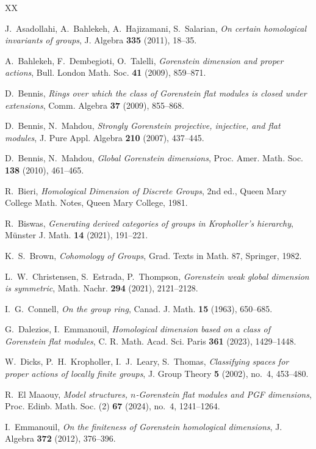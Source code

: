 \documentclass[12pt]{amsart}
\theoremstyle{remark}
\theoremstyle{definition}
\theoremstyle{plain}
\begin{document}
\begin{thebibliography}{XX}


 J.~Asadollahi, A.~Bahlekeh, A.~Hajizamani, S.~Salarian, \emph{On certain homological invariants of groups}, J. Algebra \textbf{335} (2011), 18--35.

 A.~Bahlekeh, F.~Dembegioti, O.~Talelli, \emph{Gorenstein dimension and proper actions}, Bull. London Math. Soc. \textbf{41} (2009), 859--871.

 D.~Bennis, \emph{Rings over which the class of Gorenstein flat modules is closed under extensions}, Comm. Algebra \textbf{37} (2009), 855--868.

 D.~Bennis, N.~Mahdou, \emph{Strongly Gorenstein projective, injective, and flat modules}, J. Pure Appl. Algebra \textbf{210} (2007), 437--445.

 D.~Bennis, N.~Mahdou, \emph{Global Gorenstein dimensions}, Proc. Amer. Math. Soc. \textbf{138} (2010), 461--465.

 R.~Bieri, \emph{Homological Dimension of Discrete Groups}, 2nd ed., Queen Mary College Math. Notes, Queen Mary College, 1981.

 R.~Biswas, \emph{Generating derived categories of groups in Kropholler's hierarchy}, M\"unster J. Math. \textbf{14} (2021), 191--221.

 K.~S.~Brown, \emph{Cohomology of Groups}, Grad. Texts in Math. 87, Springer, 1982.

 L.~W.~Christensen, S.~Estrada, P.~Thompson, \emph{Gorenstein weak global dimension is symmetric}, Math. Nachr. \textbf{294} (2021), 2121--2128.

 I.~G.~Connell, \emph{On the group ring},
Canad. J. Math. \textbf{15} (1963), 650--685.

 G.~Dalezios, I.~Emmanouil, \emph{Homological dimension based on a class of Gorenstein flat modules}, C. R. Math. Acad. Sci. Paris \textbf{361} (2023), 1429--1448.

 W.~Dicks, P.~H.~Kropholler, I.~J.~Leary, S.~Thomas, \emph{Classifying spaces for proper actions of locally finite groups}, J. Group Theory \textbf{5} (2002), no.~4, 453--480.

 R.~El Maaouy, \emph{Model structures, $n$-Gorenstein flat modules and PGF dimensions}, Proc. Edinb. Math. Soc. (2) \textbf{67} (2024), no.~4, 1241--1264.

 I.~Emmanouil, \emph{On the finiteness of Gorenstein homological dimensions}, J. Algebra \textbf{372} (2012), 376--396.


\end{thebibliography}
\end{document}
